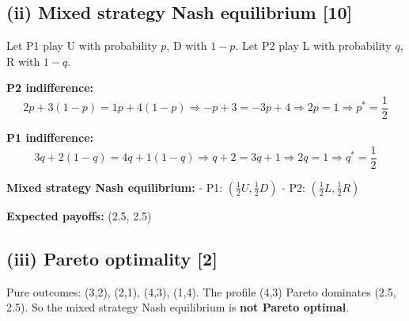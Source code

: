 \documentclass[
]{article}
\begin{document}
\subsection{(ii) Mixed strategy Nash equilibrium
{[}10{]}}\label{ii-mixed-strategy-nash-equilibrium-10}

Let P1 play U with probability \(p\), D with \(1-p\). Let P2 play L with
probability \(q\), R with \(1-q\).

\textbf{P2 indifference:} \[
2p + 3(1-p) = 1p + 4(1-p) \Rightarrow -p + 3 = -3p + 4 \Rightarrow 2p = 1 \Rightarrow p^* = \frac{1}{2}
\]

\textbf{P1 indifference:} \[
3q + 2(1-q) = 4q + 1(1-q) \Rightarrow q + 2 = 3q + 1 \Rightarrow 2q = 1 \Rightarrow q^* = \frac{1}{2}
\]

\textbf{Mixed strategy Nash equilibrium:} - P1:
\((\tfrac{1}{2} U, \tfrac{1}{2} D)\) - P2:
\((\tfrac{1}{2} L, \tfrac{1}{2} R)\)

\textbf{Expected payoffs:} (2.5, 2.5)

\subsection{(iii) Pareto optimality
{[}2{]}}\label{iii-pareto-optimality-2}

Pure outcomes: (3,2), (2,1), (4,3), (1,4). The profile (4,3) Pareto
dominates (2.5, 2.5). So the mixed strategy Nash equilibrium is
\textbf{not Pareto optimal}.
\end{document}
